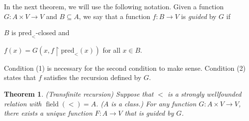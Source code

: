 \documentclass[a4paper, 11pt]{amsart}
\newtheorem{theorem}{Theorem}[subsection]
\theoremstyle{remark}
\newcommand{\pred}{\mathrm{pred}}
\DeclareMathOperator{\dom}{dom}
\DeclareMathOperator{\field}{field}
\newenvironment{enumerate-(1)}{\begin{enumerate}[label={\upshape (\arabic*)}, leftmargin=2pc]}{\end{enumerate}}
\begin{document}
In the next theorem, we will use the following notation. 
Given a function $G\colon A\times V\rightarrow V$ and $B\subseteq A$, 
we say that a function $f\colon B\rightarrow V$ is \emph{guided} by $G$ if \begin{enumerate-(1)} 
\item 
$B$ is $\pred_<$-closed and 
\item 
$f(x)=G(x,f{\upharpoonright}\pred_<(x))$ for all $x\in B$. 
\end{enumerate-(1)} 

Condition (1) is necessary for the second condition to make sense. 
Condition (2) states that $f$ satisfies the recursion defined by $G$. 


\begin{theorem}(Transfinite recursion) 
\label{transfinite recursion} 
Suppose that $<$ is a strongly wellfounded relation with $\field(<)=A$. ($A$ is a class.) 
For any function $G\colon A\times V\rightarrow V$, there exists a unique function $F\colon A\rightarrow V$ that is guided by $G$. 
\end{theorem} 
\end{document}
